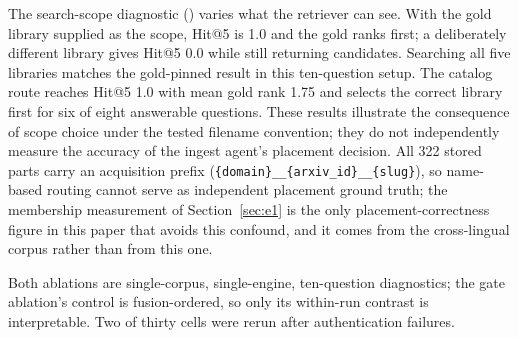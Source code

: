 The search-scope diagnostic
() varies
what the retriever can see. With the gold library supplied as the scope,
Hit@5 is 1.0 and the gold ranks first; a deliberately different library gives
Hit@5 0.0 while still returning candidates. Searching all five libraries
matches the gold-pinned result in this ten-question setup. The catalog route
reaches Hit@5 1.0 with mean gold rank 1.75 and selects the correct library
first for six of eight answerable questions. These results illustrate the
consequence of scope choice under the tested filename convention; they do not
independently measure the accuracy of the ingest agent's placement decision.
All 322 stored parts carry an acquisition prefix
(\texttt{\{domain\}\_\_\{arxiv\_id\}\_\_\{slug\}}), so name-based routing
cannot serve as independent placement ground truth; the membership
measurement of Section~\ref{sec:e1} is the only placement-correctness figure
in this paper that avoids this confound, and it comes from the cross-lingual
corpus rather than from this one.

Both ablations are single-corpus, single-engine, ten-question diagnostics; the
gate ablation's control is fusion-ordered, so only its within-run contrast is
interpretable. Two of thirty cells were rerun after authentication failures.
